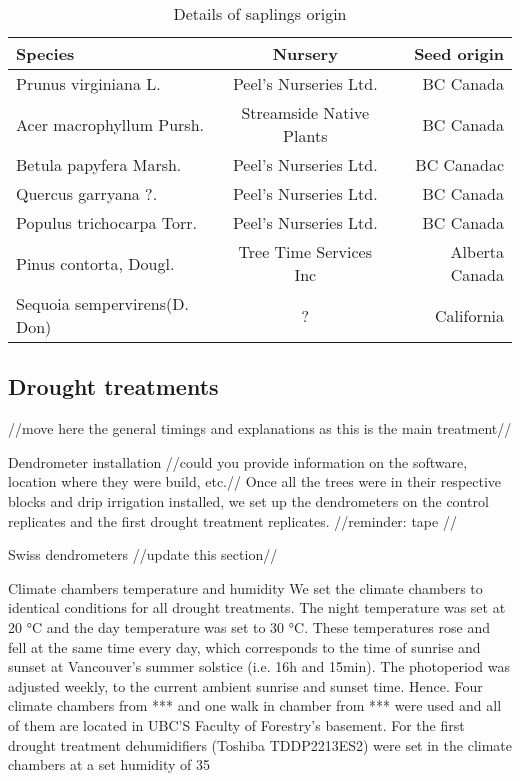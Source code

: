 \documentclass{article}
\begin{document}
	\begin{table}[h!]
		\begin{center}
			\caption{Details of saplings origin }
			\label{tab:table1}
			\begin{tabular}{l|c|r} %
				\textbf{Species} & \textbf{Nursery} & \textbf{Seed origin}\\
				\hline
				Prunus virginiana L. & Peel's Nurseries Ltd. & BC Canada\\
				Acer macrophyllum Pursh. & Streamside Native Plants & BC Canada\\
				Betula papyfera Marsh. & Peel's Nurseries Ltd. &BC Canadac\\
				Quercus garryana ?.& Peel's Nurseries Ltd. & BC Canada\\
				Populus trichocarpa Torr. & Peel's Nurseries Ltd.& BC Canada\\
				Pinus contorta, Dougl. & Tree Time Services Inc & Alberta Canada\\
				Sequoia sempervirens(D. Don)&? & California\\
				
			\end{tabular}
		\end{center}
	\end{table}
	
	\subsection*{Drought treatments}
	//move here the general timings and explanations as this is the main treatment//
	
	Dendrometer installation //could you provide information on the software, location where they were build, etc.// 
	Once all the trees were in their respective blocks and drip irrigation installed, we set up the dendrometers on the control replicates and the first drought treatment replicates. 
	//reminder: tape //
	
	Swiss dendrometers
	//update this section//
	
	Climate chambers temperature and humidity
	We set the climate chambers to identical conditions for all drought treatments. The night temperature was set at 20 °C and the day temperature was set to 30 °C. These temperatures rose and fell at the same time every day, which corresponds to the time of sunrise and sunset at Vancouver’s summer solstice (i.e. 16h and 15min). The photoperiod was adjusted weekly, to the current ambient sunrise and sunset time. Hence. Four climate chambers from *** and one walk in chamber from *** were used and all of them are located in UBC’S Faculty of Forestry’s basement. For the first drought treatment dehumidifiers (Toshiba TDDP2213ES2) were set in the climate chambers at a set humidity of 35%
	
\end{document}
